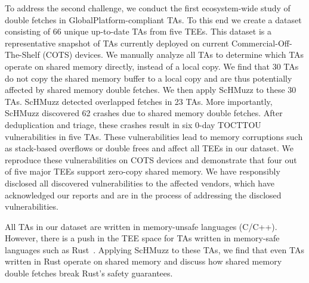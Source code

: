 \documentclass[conference]{IEEEtran}
\newcommand{\sysname}{ScHMuzz\xspace}
\newcommand{\numTAs}{66\xspace}
\newcommand{\numTAsharnessed}{30\xspace}
\newcommand{\numTEEs}{five\xspace}
\newcommand{\numTAsdf}{23\xspace}
\newcommand{\numcrashesdistill}{62\xspace}
\newcommand{\numvulns}{six\xspace}
\newcommand{\numvulnTAs}{five\xspace}
\begin{document}
To address the second challenge, we conduct the first ecosystem-wide study of 
double fetches in GlobalPlatform-compliant TAs.
To this end we create a dataset consisting of 
\numTAs{} unique up-to-date TAs from \numTEEs{} TEEs.
This dataset is a representative snapshot of TAs currently deployed on current 
Commercial-Off-The-Shelf (COTS) devices. We manually analyze all TAs to determine 
which TAs operate on shared memory directly, instead of a local copy. We find that 
\numTAsharnessed{} TAs do not copy the shared memory buffer to a local copy and are 
thus potentially affected by shared memory double fetches. 
We then apply \sysname to these \numTAsharnessed{} TAs.
\sysname detected overlapped fetches in \numTAsdf TAs.
More importantly, \sysname discovered \numcrashesdistill{} crashes due to shared memory double fetches.
After deduplication and triage, these crashes result in \numvulns{} 0-day TOCTTOU 
vulnerabilities in \numvulnTAs{} TAs. These vulnerabilities lead to memory corruptions such as 
stack-based overflows or double frees and affect all TEEs in our dataset.
We reproduce these vulnerabilities on COTS devices and demonstrate that 
four out of five major TEEs support zero-copy shared memory.
We have responsibly disclosed all discovered vulnerabilities to the affected vendors, which 
have acknowledged our reports and are in the process of addressing the disclosed 
vulnerabilities.


All TAs in our dataset are written in memory-unsafe languages (C/C++). 
However, there is a push in the TEE space for TAs written in memory-safe languages such as 
Rust~\cite{rustee,teaclave}. Applying \sysname to these TAs, we find that even TAs written 
in Rust operate on shared memory and discuss how shared memory double fetches break 
Rust's safety guarantees.
\end{document}
